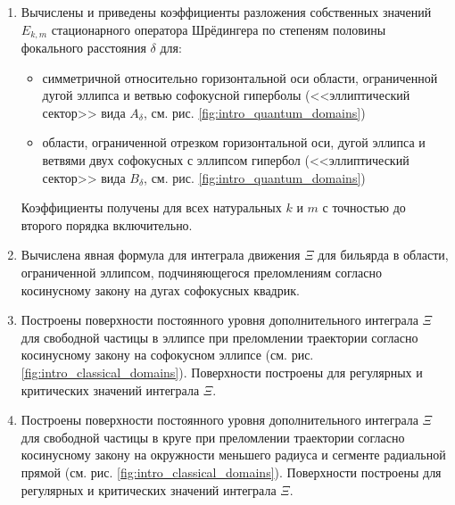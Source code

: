 {}
\begin{enumerate}[beginpenalty=10000] %
  \item Вычислены и приведены коэффициенты разложения собственных значений $E_{k,m}$ стационарного оператора Шрёдингера по степеням половины фокального расстояния $\delta$ для:
   \begin{itemize}[beginpenalty=10000] %
  \item симметричной относительно горизонтальной оси области, ограниченной дугой эллипса и ветвью софокусной  гиперболы (<<эллиптический сектор>> вида $A_\delta$, см. рис. \ref{fig:intro_quantum_domains})
  \item области, ограниченной отрезком горизонтальной оси, дугой эллипса и ветвями двух софокусных с эллипсом гипербол (<<эллиптический сектор>> вида $B_\delta$, см. рис. \ref{fig:intro_quantum_domains})
  \end{itemize}
  Коэффициенты получены для всех натуральных $k$ и $m$ с точностью до второго порядка включительно.

  \item Вычислена явная формула для интеграла движения $\Xi$ для бильярда в области, ограниченной эллипсом, подчиняющегося преломлениям согласно косинусному закону на дугах софокусных квадрик.
  \item Построены поверхности постоянного уровня дополнительного интеграла $\Xi$ для свободной частицы в эллипсе при преломлении траектории согласно косинусному закону на софокусном эллипсе (см. рис. \ref{fig:intro_classical_domains}). Поверхности построены для регулярных и критических значений интеграла $\Xi$.
   \item Построены поверхности постоянного уровня дополнительного интеграла $\Xi$ для свободной частицы в круге при преломлении траектории согласно косинусному закону на окружности меньшего радиуса и сегменте радиальной прямой (см. рис. \ref{fig:intro_classical_domains}). Поверхности построены для регулярных и критических значений интеграла $\Xi$.
\end{enumerate}



